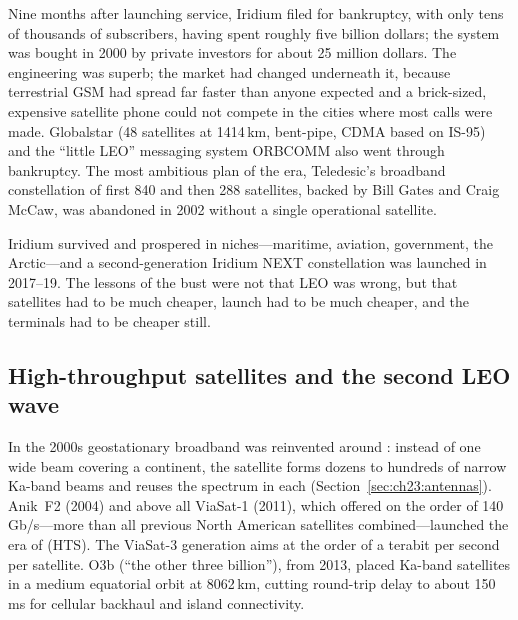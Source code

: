\begin{history}
Nine months after launching service, Iridium filed for bankruptcy, with only tens of thousands of
subscribers, having spent roughly five billion dollars; the system was bought in 2000 by private
investors for about 25 million dollars. The engineering was superb; the market had changed
underneath it, because terrestrial GSM had spread far faster than anyone expected and a
brick-sized, expensive satellite phone could not compete in the cities where most calls were
made. Globalstar (48 satellites at 1414\,km, bent-pipe, CDMA based on IS-95) and the ``little
LEO'' messaging system ORBCOMM also went through bankruptcy. The most ambitious plan of the era,
Teledesic's broadband constellation of first 840 and then 288 satellites, backed by Bill Gates and
Craig McCaw, was abandoned in 2002 without a single operational satellite.

Iridium survived and prospered in niches---maritime, aviation, government, the Arctic---and a
second-generation Iridium NEXT constellation was launched in 2017--19. The lessons of the bust were
not that LEO was wrong, but that satellites had to be much cheaper, launch had to be much cheaper,
and the terminals had to be cheaper still.
\end{history}


\subsection{High-throughput satellites and the second LEO wave}

In the 2000s geostationary broadband was reinvented around : instead of one
wide beam covering a continent, the satellite forms dozens to hundreds of narrow Ka-band beams
and reuses the spectrum in each (Section~\ref{sec:ch23:antennas}). Anik~F2 (2004) and above all
ViaSat-1 (2011), which offered on the order of 140\,Gb/s---more than all previous North American
satellites combined---launched the era of  (HTS). The ViaSat-3
generation aims at the order of a terabit per second per satellite. O3b (``the other three
billion''), from 2013, placed Ka-band satellites in a medium equatorial orbit at 8062\,km,
cutting round-trip delay to about 150\,ms for cellular backhaul and island connectivity.

